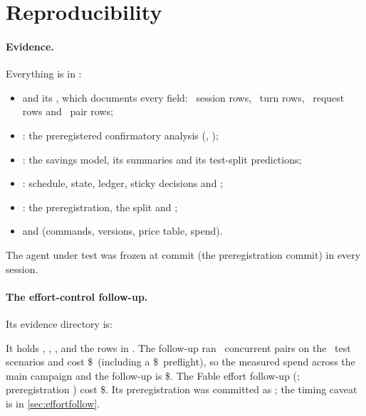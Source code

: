 \section{Reproducibility}\label{sec:repro}

\paragraph{Evidence.} Everything is in :
\begin{itemize}
  \item {} and its , which documents every field: \NSessions\ session
    rows, \NTurns\ turn rows, \NRequests\ request rows and \NPairs\ pair rows;
  \item {}: the preregistered confirmatory analysis (, );
  \item {}: the savings model, its summaries and its test-split predictions;
  \item {}: schedule, state, ledger, sticky decisions and ;
  \item {}: the preregistration, the split and ;
  \item {} and  (commands, versions, price table, spend).
\end{itemize}
The agent under test was frozen at commit \code{\BuildSha} (the preregistration commit) in every session.

\paragraph{The effort-control follow-up.} Its evidence directory is:
\begin{center}\end{center}
It holds , , ,  and the
rows in . The follow-up ran \EcPairs\ concurrent pairs on the \EcScen\ test scenarios and cost
\$\EcSpend\ (including a \$\EcPreflight\ preflight), so the measured spend across the main campaign and the
follow-up is \$\SpendWithFollowup. The Fable effort follow-up
(; preregistration \code{\EfPreregSha}) cost \$\EfSpend. Its preregistration was committed as \code{\EcPreregSha}; the timing caveat is
in \cref{sec:effortfollow}.

